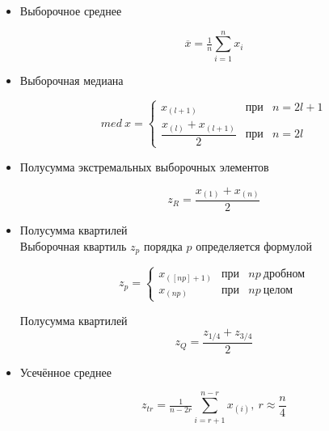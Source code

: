 \documentclass[12pt,a4paper]{article}
\begin{document}
	\begin{itemize}
		\item Выборочное среднее

		\begin{equation} \label{eq:mean}
			\overline{x} = \tfrac{1}{n}\sum_{i = 1}^{n}x_i
		\end{equation}

		\item Выборочная медиана

		\begin{equation} \label{eq:median}
			med\ x = \left\{
			\begin{array}{ccl}
			x_{(l + 1)} & \text{при} & n = 2l + 1\\
			\dfrac{x_{(l)} + x_{(l + 1)}}{2} & \text{при} & n = 2l
			\end{array}
			\right.
		\end{equation}

		\item Полусумма экстремальных выборочных элементов

		\begin{equation} \label{eq:half_sum_of_extremal_elements}
			z_{R} = \frac{x_{(1)} + x_{(n)}}{2}
		\end{equation}

		\item Полусумма квартилей \\
		Выборочная квартиль \( z_{p} \) порядка \( p \) определяется формулой

		\begin{equation} \label{eq:quartil}
			z_{p} = \left\{
			\begin{array}{ccl}
			x_{([np]+ 1)} & \text{при} & np\ \text{дробном}\\
			x_{(np)} & \text{при} & np\ \text{целом}
			\end{array}
			\right.
		\end{equation}

		Полусумма квартилей \\

		\begin{equation}  \label{eq:half_sum_of_quartiles}
			z_{Q} = \dfrac{z_{1/4} + z_{3/4}}{2}
		\end{equation}

		\item Усечённое среднее

		\begin{equation} \label{eq:trimmed_mean}
			z_{tr} = \tfrac{1}{n - 2r}\sum_{i = r + 1}^{n - r}x_{(i)},\
			r\approx\dfrac{n}{4}
		\end{equation}


\end{itemize}
\end{document}
